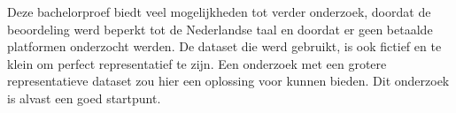 Deze bachelorproef biedt veel mogelijkheden tot verder onderzoek, doordat de beoordeling werd beperkt tot de Nederlandse taal en doordat er geen betaalde platformen onderzocht werden. De dataset die werd gebruikt, is ook fictief en te klein om perfect representatief te zijn. Een onderzoek met een grotere representatieve dataset zou hier een oplossing voor kunnen bieden. Dit onderzoek is alvast een goed startpunt.





























